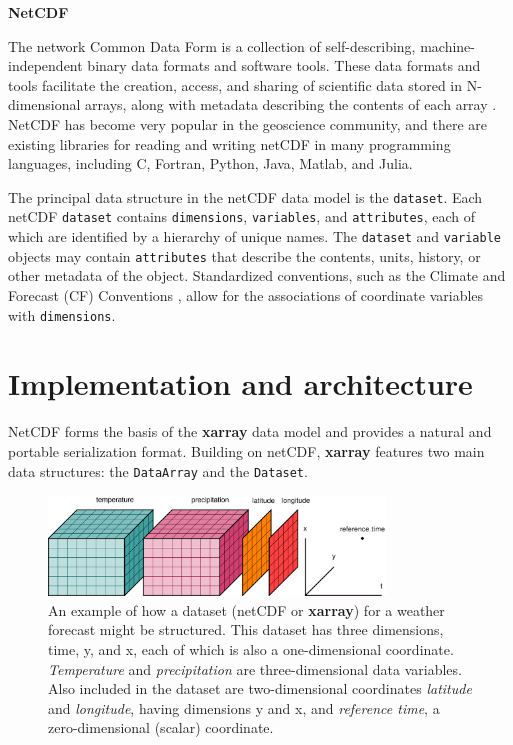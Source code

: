 \documentclass{jors}
\begin{document}
\textbf{NetCDF}

The network Common Data Form is a collection of self-describing, machine-independent binary data formats and software tools.
These data formats and tools facilitate the creation, access, and sharing of scientific data stored in N-dimensional arrays, along with metadata describing the contents of each array \citep{Rew_1990}.
NetCDF has become very popular in the geoscience community, and there are existing libraries for reading and writing netCDF in many programming languages, including C, Fortran, Python, Java, Matlab, and Julia.

The principal data structure in the netCDF data model is the \verb|dataset|.
Each netCDF \verb|dataset| contains \verb|dimensions|, \verb|variables|, and \verb|attributes|, each of which are identified by a hierarchy of unique names.
The \verb|dataset| and \verb|variable| objects may contain \verb|attributes| that describe the contents, units, history, or other metadata of the object.
Standardized conventions, such as the Climate and Forecast (CF) Conventions \citep{eaton2003netcdf}, allow for the associations of coordinate variables with \verb|dimensions|.

\section*{Implementation and architecture}

NetCDF forms the basis of the \textbf{xarray} data model and provides a natural and portable serialization format.
Building on netCDF, \textbf{xarray} features two main data structures: the \verb|DataArray| and the \verb|Dataset|.

\begin{figure}
	\centering
	\includegraphics[width=0.8\textwidth]{dataset-diagram_original}
	\caption{An example of how a dataset (netCDF or \textbf{xarray}) for a weather forecast might be structured. This dataset has three dimensions, time, y, and x, each of which is also a one-dimensional coordinate. \textit{Temperature} and \textit{precipitation} are three-dimensional data variables.  Also included in the dataset are two-dimensional coordinates \textit{latitude} and \textit{longitude}, having dimensions y and x, and \textit{reference time}, a zero-dimensional (scalar) coordinate.}
	\label{fig:dataset_diagram}
\end{figure}
\end{document}
